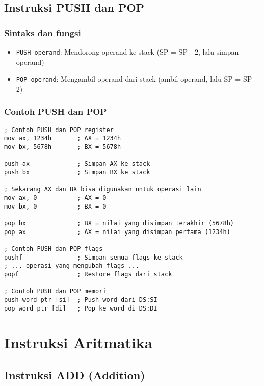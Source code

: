 \documentclass[../main.tex]{subfiles}
\begin{document}
        \subsection{Instruksi PUSH dan POP}
            \subsubsection{Sintaks dan fungsi}
\begin{itemize}
    \item \texttt{PUSH operand}: Mendorong operand ke stack (SP = SP - 2, lalu simpan operand)
    \item \texttt{POP operand}: Mengambil operand dari stack (ambil operand, lalu SP = SP + 2)
\end{itemize}

            \subsubsection{Contoh PUSH dan POP}
\begin{lstlisting}[language={[x86masm]Assembler}, caption=Instruksi PUSH dan POP, label={lst:push-pop-examples}]
; Contoh PUSH dan POP register
mov ax, 1234h       ; AX = 1234h
mov bx, 5678h       ; BX = 5678h

push ax             ; Simpan AX ke stack
push bx             ; Simpan BX ke stack

; Sekarang AX dan BX bisa digunakan untuk operasi lain
mov ax, 0           ; AX = 0
mov bx, 0           ; BX = 0

pop bx              ; BX = nilai yang disimpan terakhir (5678h)
pop ax              ; AX = nilai yang disimpan pertama (1234h)

; Contoh PUSH dan POP flags
pushf               ; Simpan semua flags ke stack
; ... operasi yang mengubah flags ...
popf                ; Restore flags dari stack

; Contoh PUSH dan POP memori
push word ptr [si]  ; Push word dari DS:SI
pop word ptr [di]   ; Pop ke word di DS:DI
\end{lstlisting}

    \section{Instruksi Aritmatika}

        \subsection{Instruksi ADD (Addition)}
\end{document}

